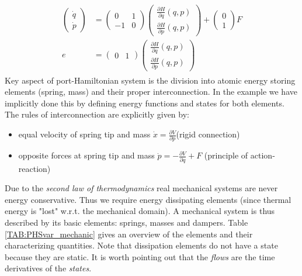 \documentclass[a4paper,twoside, openright,12pt]{report}
\begin{document}
\begin{eqnarray}\label{EQ:HSexample}
\begin{aligned}
	\begin{pmatrix}\dot{q} \\ \dot{p}\end{pmatrix} &=
	\begin{pmatrix}0 & 1 \\ -1 & 0\end{pmatrix}
	\begin{pmatrix}\frac{\partial H}{\partial q}(q,p) \\ \frac{\partial H}{\partial p}(q,p)\end{pmatrix} + 
	\begin{pmatrix}0 \\ 1\end{pmatrix} F\\
	e &= \begin{pmatrix}	0 & 1\end{pmatrix}\begin{pmatrix}\frac{\partial H}{\partial q}(q,p) \\ \frac{\partial H}{\partial p}(q,p)\end{pmatrix}
	\end{aligned}
\end{eqnarray}
\newline
Key aspect of port-Hamiltonian system is the division into atomic energy storing elements (spring, mass) and their proper interconnection. In the example we have implicitly done this by defining energy functions and states for both elements. The rules of interconnection are explicitly given by: 
\begin{itemize}
\itemsep0em
	\item equal velocity of spring tip and mass $\dot{x}=\frac{\partial V}{\partial p}$(rigid connection)
	\item opposite forces at spring tip and mass $\dot{p}=-\frac{\partial V}{\partial q}+F$ (principle of action-reaction) 
\end{itemize}
Due to the \emph{second law of thermodynamics} real mechanical systems are never energy conservative. Thus we require energy dissipating elements (since thermal energy is "lost" w.r.t. the mechanical domain). A mechanical system is thus described by its basic elements: springs, masses and dampers. Table \ref{TAB:PHSvar_mechanic} gives an overview of the elements and their characterizing quantities. Note that dissipation elements do not have a state because they are static. It is worth pointing out that the \emph{flows} are the time derivatives of the \emph{states}.    
\end{document}
